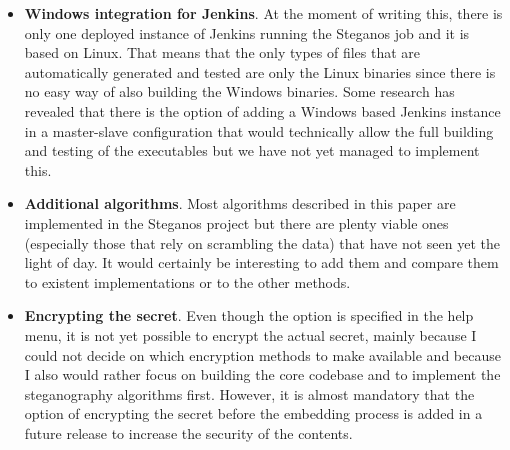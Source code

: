 \begin{multicols}{2}
\begin{itemize}
	\item \textbf{Windows integration for Jenkins}. At the moment of writing this, there is only one deployed instance of Jenkins running the Steganos job and it is based on Linux. That means that the only types of files that are automatically generated and tested are only the Linux binaries since there is no easy way of also building the Windows binaries. Some research has revealed that there is the option of adding a Windows based Jenkins instance in a master-slave configuration that would technically allow the full building and testing of the executables but we have not yet managed to implement this. 
	\item \textbf{Additional algorithms}. Most algorithms described in this paper are implemented in the Steganos project but there are plenty viable ones (especially those that rely on scrambling the data) that have not seen yet the light of day. It would certainly be interesting to add them and compare them to existent implementations or to the other methods.
	\item \textbf{Encrypting the secret}. Even though the option is specified in the help menu, it is not yet possible to encrypt the actual secret, mainly because I could not decide on which encryption methods to make available and because I also would rather focus on building the core codebase and to implement the steganography algorithms first. However, it is almost mandatory that the option of encrypting the secret before the embedding process is added in a future release to increase the security of the contents.
\end{itemize}
\end{multicols}